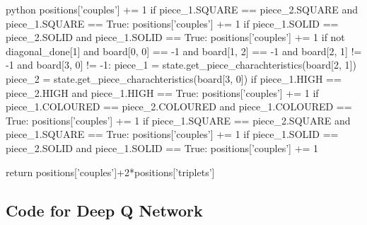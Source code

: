 \begin{mintedbox}{python}
            positions['couples'] += 1
        if piece_1.SQUARE == piece_2.SQUARE and piece_1.SQUARE == True:
            positions['couples'] += 1
        if piece_1.SOLID == piece_2.SOLID and piece_1.SOLID == True:
            positions['couples'] += 1
    if not diagonal_done[1] and board[0, 0] == -1 and board[1, 2] == -1 and board[2, 1] != -1 and board[3, 0] != -1:
        piece_1 = state.get_piece_charachteristics(board[2, 1])
        piece_2 = state.get_piece_charachteristics(board[3, 0])
        if piece_1.HIGH == piece_2.HIGH and piece_1.HIGH == True:
            positions['couples'] += 1
        if piece_1.COLOURED == piece_2.COLOURED and piece_1.COLOURED == True:
            positions['couples'] += 1
        if piece_1.SQUARE == piece_2.SQUARE and piece_1.SQUARE == True:
            positions['couples'] += 1
        if piece_1.SOLID == piece_2.SOLID and piece_1.SOLID == True:
            positions['couples'] += 1

    return positions['couples']+2*positions['triplets']

\end{mintedbox}

\subsection{Code for Deep Q Network}

